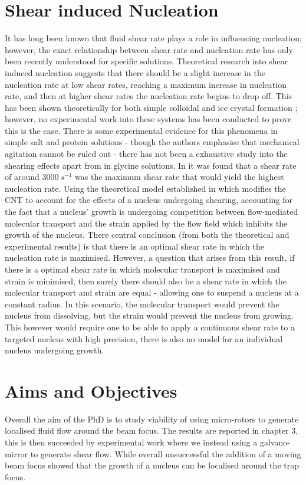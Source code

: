 \section{Shear induced Nucleation}
It has long been known that fluid shear rate plays a role in influencing
nucleation; however, the exact relationship between shear rate and nucleation
rate has only been recently understood for specific solutions. Theoretical research 
into shear induced nucleation suggests that there should be a slight increase 
in the nucleation rate at low shear rates, reaching a maximum increase in 
nucleation rate, and then at higher shear rates the nucleation rate begins 
to drop off. This has been shown theoretically for both simple colloidal
\cite{Mura2016,Debuysschere2023,Richard2015} and ice crystal formation 
\cite{Goswami2020}; however, no experimental work into these systems has 
been conducted to prove this is the case.  There is some experimental 
evidence for this phenomena in simple salt and protein solutions - though 
the authors emphasise that mechanical agitation cannot be ruled out - 
there has not been a exhaustive study into the shearing effects apart from 
in glycine solutions. In \cite{Debuysschere2023} it was found that a shear 
rate of around $3000\ s^{-1}$ was the maximum shear rate that would yield 
the highest nucleation rate. Using the theoretical model established in 
\cite{Mura2016,2001} which modifies the CNT to account for the effects of 
a nucleus undergoing shearing, accounting for the fact that a nucleus' 
growth is undergoing competition between flow-mediated molecular transport 
and the strain applied by the flow field which inhibits the growth of the 
nucleus. There central conclusion (from both the theoretical and experimental 
results) is that there is an optimal shear rate in which the nucleation 
rate is maximised. However, a question that arises from this result, if 
there is a optimal shear rate in which molecular transport is maximised 
and strain is minimised, then surely there should also be a shear rate 
in which the molecular transport and strain are equal - allowing one to 
suspend a nucleus at a constant radius. In this scenario, the molecular 
transport would prevent the nucleus from dissolving, but the strain would 
prevent the nucleus from growing. This however would require one to be 
able to apply a continuous shear rate to a targeted nucleus with high 
precision, there is also no model for an individual nucleus undergoing growth.

\section{Aims and Objectives}
Overall the aim of the PhD is to study viability of using micro-rotors to
generate localised fluid flow around the beam focus. The results are reported
in chapter 3, this is then succeeded by experimental work where we 
instead using a galvano-mirror to generate shear flow. While overall unsuccessful
the addition of a moving beam focus showed that the growth of a nucleus can be localised around the trap focus. 

